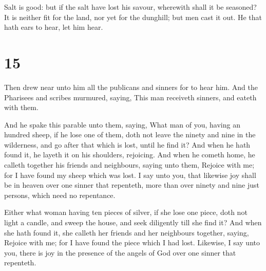  Salt is good: but if the salt have lost his savour,
wherewith shall it be seasoned?  It is neither fit for
the land, nor yet for the dunghill; but men cast it out. He that hath
ears to hear, let him hear.

\hypertarget{section-14}{%
\section{15}\label{section-14}}

 Then drew near unto him all the publicans and sinners for
to hear him.  And the Pharisees and scribes murmured,
saying, This man receiveth sinners, and eateth with them.

 And he spake this parable unto them, saying,
 What man of you, having an hundred sheep, if he lose one
of them, doth not leave the ninety and nine in the wilderness, and go
after that which is lost, until he find it?  And when he
hath found it, he layeth it on his shoulders, rejoicing. 
And when he cometh home, he calleth together his friends and neighbours,
saying unto them, Rejoice with me; for I have found my sheep which was
lost.  I say unto you, that likewise joy shall be in
heaven over one sinner that repenteth, more than over ninety and nine
just persons, which need no repentance.

 Either what woman having ten pieces of silver, if she
lose one piece, doth not light a candle, and sweep the house, and seek
diligently till she find it?  And when she hath found it,
she calleth her friends and her neighbours together, saying, Rejoice
with me; for I have found the piece which I had lost. 
Likewise, I say unto you, there is joy in the presence of the angels of
God over one sinner that repenteth.

